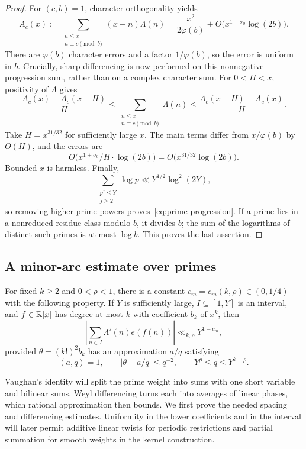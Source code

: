 \begin{proof}
For $(c,b)=1$, character orthogonality yields
\[
 A_c(x):=\sum_{\substack{n\le x\\n\equiv c\pmod b}}
                 (x-n)\Lambda(n)
 =\frac{x^2}{2\varphi(b)}
      +O\bigl(x^{1+\sigma_0}\log(2b)\bigr).
\]
There are $\varphi(b)$ character errors and a factor $1/\varphi(b)$,
so the error is uniform in $b$.  Crucially, sharp differencing is now
performed on this nonnegative progression sum, rather than on a complex
character sum.  For $0<H<x$, positivity of $\Lambda$ gives
\[
 \frac{A_c(x)-A_c(x-H)}{H}
 \le \sum_{\substack{n\le x\\n\equiv c\pmod b}}\Lambda(n)
 \le \frac{A_c(x+H)-A_c(x)}{H}.
\]
Take $H=x^{31/32}$ for sufficiently large $x$.  The main terms differ
from $x/\varphi(b)$ by $O(H)$, and the errors are
\[
 O\bigl(x^{1+\sigma_0}/H\cdot\log(2b)\bigr)
   =O\bigl(x^{31/32}\log(2b)\bigr).
\]
Bounded $x$ is harmless.  Finally,
\[
 \sum_{\substack{p^j\le Y\\j\ge2}}\log p
 \ll Y^{1/2}\log^2(2Y),
\]
so removing higher prime powers proves~\eqref{eq:prime-progression}.
If a prime lies in a nonreduced residue class modulo $b$, it divides
$b$; the sum of the logarithms of distinct such primes is at most
$\log b$.  This proves the last assertion.
\end{proof}

\subsection{A minor-arc estimate over primes}

\begin{proposition}\label{prop:prime-minor-arcs}
For fixed $k\ge2$ and $0<\rho<1$, there is a constant
$c_m=c_m(k,\rho)\in(0,1/4)$ with the following property.  If $Y$ is
sufficiently large, $I\subseteq[1,Y]$ is an interval, and
$f\in\mathbb R[x]$ has degree at most $k$ with coefficient $b_k$ of $x^k$,
then
\begin{equation}\label{eq:prime-minor-arc}
 \left|\sum_{n\in I}\Lambda'(n)e(f(n))\right|
 \ll_{k,\rho}Y^{1-c_m},
\end{equation}
provided $\theta=(k!)^2b_k$ has an approximation $a/q$ satisfying
\begin{equation}\label{eq:minor-rational-range}
 (a,q)=1,\qquad |\theta-a/q|\le q^{-2},\qquad
 Y^\rho\le q\le Y^{k-\rho}.
\end{equation}
\end{proposition}

Vaughan's identity will split the prime weight into sums with one short
variable and bilinear sums.  Weyl differencing turns each into averages
of linear phases, which rational approximation then bounds.  We first
prove the needed spacing and differencing estimates.  Uniformity in the
lower coefficients and in the interval will later permit additive linear
twists for periodic restrictions and partial summation for smooth weights
in the kernel construction.


